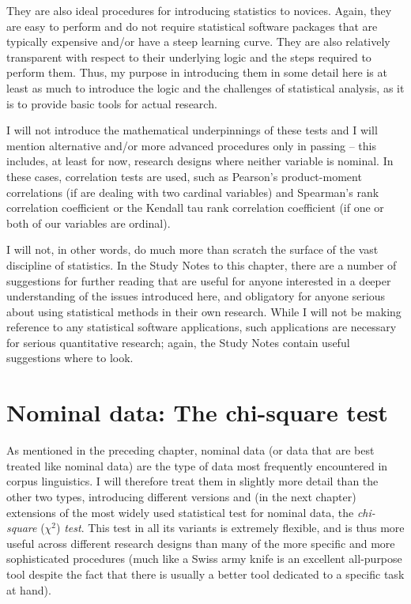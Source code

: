 They are also ideal procedures for introducing statistics to novices. Again, they are easy to perform and do not require statistical software packages that are typically expensive and/or have a steep learning curve. They are also relatively transparent with respect to their underlying logic and the steps required to perform them. Thus, my purpose in introducing them in some detail here is at least as much to introduce the logic and the challenges of statistical analysis, as it is to provide basic tools for actual research.

I will not introduce the mathematical underpinnings of these tests and I will mention alternative and/or more advanced procedures only in passing -- this includes, at least for now, research designs where neither variable is nominal. In these cases, correlation tests are used, such as Pearson's product-moment correlations (if are dealing with two cardinal variables) and Spearman's rank correlation coefficient or the Kendall tau rank correlation coefficient (if one or both of our variables are ordinal).

I will not, in other words, do much more than scratch the surface of the vast discipline of statistics. In the Study Notes to this chapter, there are a number of suggestions for further reading that are useful for anyone interested in a deeper understanding of the issues introduced here, and obligatory for anyone serious about using statistical methods in their own research. While I will not be making reference to any statistical software applications, such applications are necessary for serious quantitative research; again, the Study Notes contain useful suggestions where to look.

\section{Nominal data: The chi-square test}
\label{sec:chisquaretest}

As mentioned in the preceding chapter, nominal data (or data that are best treated like nominal data) are the type of data most frequently encountered in corpus linguistics. I will therefore treat them in slightly more detail than the other two types, introducing different versions and (in the next chapter) extensions of the most widely used statistical test for nominal data, the \textit{chi-square} ($\chi^2$) \textit{test}. This test in all its variants is extremely flexible, and is thus more useful across different research designs than many of the more specific and more sophisticated procedures (much like a Swiss army knife is an excellent all-purpose tool despite the fact that there is usually a better tool dedicated to a specific task at hand).

